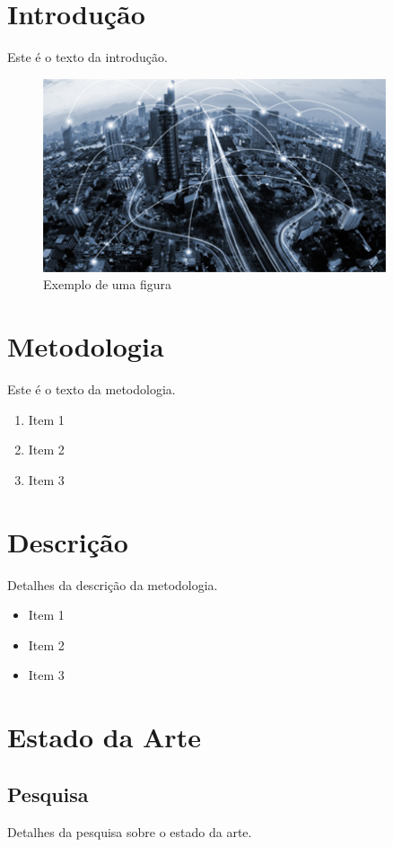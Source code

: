\documentclass[12pt,a4paper,final]{article}
\begin{document}
\section{Introdução}
Este é o texto da introdução. 

\begin{figure}[h!]
    \centering
    \includegraphics[width=0.9\textwidth]{img_meitw}
    \caption{Exemplo de uma figura}
    \label{fig:exemplo}
\end{figure}

\section{Metodologia}
Este é o texto da metodologia.

\begin{enumerate}
    \item Item 1
    \item Item 2
    \item Item 3
\end{enumerate}

\section{Descrição}
Detalhes da descrição da metodologia.

\begin{itemize}
    \item Item 1
    \item Item 2
    \item Item 3
\end{itemize}

\section{Estado da Arte}
\subsection{Pesquisa}
Detalhes da pesquisa sobre o estado da arte.
\end{document}
